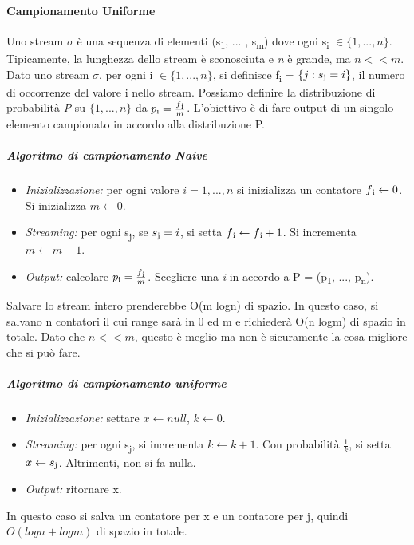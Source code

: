 \documentclass{article}
\begin{document}
\begin{appendices}
\paragraph{Campionamento Uniforme}
Uno stream $\sigma$ è una sequenza di elementi (s\textsubscript{1}, ... , s\textsubscript{m}) dove ogni s\textsubscript{i} $\in \{1, ... , n\}$. Tipicamente, la lunghezza dello stream è sconosciuta e \textit{n} è grande, ma $n << m$. \\
Dato uno stream $\sigma$, per ogni i $\in \{1, ... , n\}$, si definisce f\textsubscript{i} = $\{ j : s\textsubscript{j} = i \}$, il numero di occorrenze del valore i nello stream. Possiamo definire la distribuzione di probabilità \textit{P} su $\{1, ... , n\}$ da $p\textsubscript{i} =  \frac{f\textsubscript{i}}{m}$. L'obiettivo è di fare output di un singolo elemento campionato in accordo alla distribuzione P. \\
\subparagraph{Algoritmo di campionamento Naive}
\begin{itemize}
    \item \textit{Inizializzazione:} per ogni valore $i = 1, ..., n$ si inizializza un contatore $f\textsubscript{i} \leftarrow 0 $. Si inizializza $m \leftarrow 0$.
    \item \textit{Streaming:} per ogni s\textsubscript{j}, se $s\textsubscript{j} = i$, si setta $f\textsubscript{i} \leftarrow f\textsubscript{i} + 1$. Si incrementa $m \leftarrow m + 1$.
    \item \textit{Output:} calcolare $p\textsubscript{i} =  \frac{f\textsubscript{i}}{m}$. Scegliere una \textit{i} in accordo a P = (p\textsubscript{1}, ..., p\textsubscript{n}).
\end{itemize}
Salvare lo stream intero prenderebbe O(m logn) di spazio. In questo caso, si salvano n contatori il cui range sarà in 0 ed m e richiederà O(n logm) di spazio in totale. Dato che $n << m$, questo è meglio ma non è sicuramente la cosa migliore che si può fare. 
\subparagraph{Algoritmo di campionamento uniforme}
\begin{itemize}
    \item \textit{Inizializzazione:} settare $x \leftarrow null$, $k \leftarrow 0$.
    \item \textit{Streaming:} per ogni s\textsubscript{j}, si incrementa $k \leftarrow k + 1$. Con probabilità $\frac{1}{k}$, si setta $x \leftarrow s\textsubscript{j}$. Altrimenti, non si fa nulla.
    \item \textit{Output:} ritornare x.
\end{itemize}
In questo caso si salva un contatore per x e un contatore per j, quindi $O(log n + log m )$ di spazio in totale.


\end{appendices}
\end{document}
